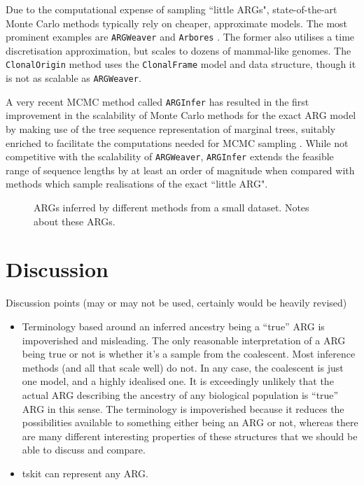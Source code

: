 \documentclass{article}
\begin{document}
Due to the computational expense of sampling ``little ARGs", state-of-the-art
Monte Carlo methods typically rely on cheaper, approximate models.
The most prominent examples are \texttt{ARGWeaver} \citep{rasmussen2014genome}
and \texttt{Arbores} \citep{heine2018bridging}. The former also utilises a time
discretisation approximation, but scales to dozens of mammal-like genomes.
The \texttt{ClonalOrigin} method \citep{didelot2010inference,
medinaaguayo2020speeding} uses the \texttt{ClonalFrame}
model and data structure, though it is not as scalable as \texttt{ARGWeaver}.

A very recent MCMC method called \texttt{ARGInfer} has resulted in the first
improvement in the scalability of Monte Carlo methods for the exact ARG model
by making use of the tree sequence representation of marginal trees, suitably enriched
to facilitate the computations needed for MCMC sampling \citep{mahmoudi2021inference}.
While not competitive with the scalability of \texttt{ARGWeaver}, \texttt{ARGInfer} extends
the feasible range of sequence lengths by at least an order of magnitude when
compared with methods which sample realisations of the exact ``little ARG".


\begin{figure}
\vspace{5em}
\caption{\label{fig-inferred-args}
ARGs inferred by different methods from a small dataset. Notes about these
ARGs.
}
\end{figure}

\section*{Discussion}

Discussion points (may or may not be used, certainly would be heavily revised)

\begin{itemize}
\item Terminology based around an inferred ancestry being a ``true''
ARG is impoverished and misleading. The only reasonable interpretation
of a ARG being true or not is whether it's a sample from the coalescent.
Most inference methods (and all that scale well) do not. In any case,
the coalescent is just one model, and a highly idealised one. It is
exceedingly unlikely that the actual ARG describing the ancestry
of any biological population is ``true'' ARG in this sense. The terminology is
impoverished because it reduces the possibilities available
to something either being an ARG or not, whereas there are many different
interesting properties of these structures that we should be able to
discuss and compare.
\item tskit can represent any ARG.
\end{itemize}



\end{document}
